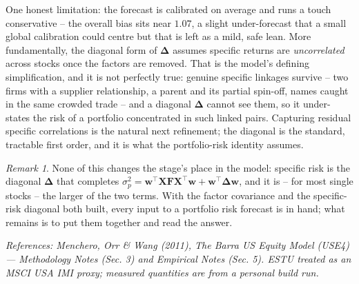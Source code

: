 \documentclass[11pt]{article}
\theoremstyle{definition}
\theoremstyle{plain}
\theoremstyle{remark}
\newtheorem*{remark}{Remark}
\newcommand{\T}{^{\!\top}}
\newcommand{\wvec}{\mathbf{w}}
\newcommand{\Xmat}{\mathbf{X}}
\newcommand{\Fmat}{\mathbf{F}}
\newcommand{\Del}{\boldsymbol{\Delta}}
\begin{document}
\begin{pitfall}
One honest limitation: the forecast is calibrated on average and runs a touch conservative -- the overall bias sits near $1.07$, a slight under-forecast that a small global calibration could centre but that is left as a mild, safe lean. More fundamentally, the diagonal form of $\Del$ assumes specific returns are \emph{uncorrelated} across stocks once the factors are removed. That is the model's defining simplification, and it is not perfectly true: genuine specific linkages survive -- two firms with a supplier relationship, a parent and its partial spin-off, names caught in the same crowded trade -- and a diagonal $\Del$ cannot see them, so it under-states the risk of a portfolio concentrated in such linked pairs. Capturing residual specific correlations is the natural next refinement; the diagonal is the standard, tractable first order, and it is what the portfolio-risk identity assumes.
\end{pitfall}

\begin{remark}
None of this changes the stage's place in the model: specific risk is the diagonal $\Del$ that completes $\sigma_p^2=\wvec\T\Xmat\Fmat\Xmat\T\wvec+\wvec\T\Del\wvec$, and it is -- for most single stocks -- the larger of the two terms. With the factor covariance and the specific-risk diagonal both built, every input to a portfolio risk forecast is in hand; what remains is to put them together and read the answer.
\end{remark}

\begin{center}\small\itshape
References: Menchero, Orr \& Wang (2011), \textit{The Barra US Equity Model (USE4)} --- Methodology Notes (Sec. 3) and Empirical Notes (Sec. 5). ESTU treated as an MSCI USA IMI proxy; measured quantities are from a personal build run.
\end{center}
\end{document}

